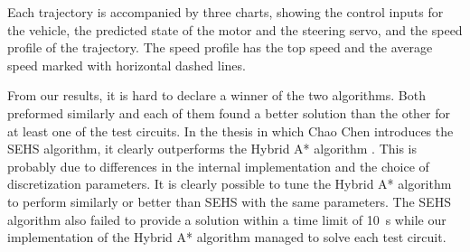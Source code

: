 Each trajectory is accompanied by three charts, showing the control inputs for the vehicle, the predicted state of the motor and the steering servo, and the speed profile of the trajectory. The speed profile has the top speed and the average speed marked with horizontal dashed lines.

From our results, it is hard to declare a winner of the two algorithms. Both preformed similarly and each of them found a better solution than the other for at least one of the test circuits. In the thesis in which Chao Chen introduces the \gls{SEHS} algorithm, it clearly outperforms the Hybrid A* algorithm \cite{SEHS}. This is probably due to differences in the internal implementation and the choice of discretization parameters. It is clearly possible to tune the Hybrid A* algorithm to perform similarly or better than \gls*{SEHS} with the same parameters. The \gls*{SEHS} algorithm also failed to provide a solution within a time limit of \SI{10}{\second} while our implementation of the Hybrid A* algorithm managed to solve each test circuit.

